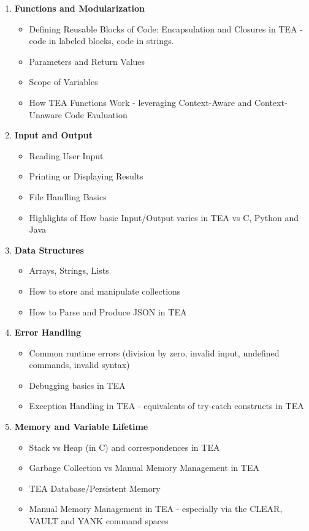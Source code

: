 \documentclass[a4paper, 18pt]{book} %
\begin{document}
{{{\begin{appendices}
\begin{enumerate}
\item{\textbf{Functions and Modularization}
\begin{itemize}
\item Defining Reusable Blocks of Code: Encapsulation and Closures in TEA - code in labeled blocks, code in strings.
\item Parameters and Return Values
\item Scope of Variables
\item How TEA Functions Work - leveraging Context-Aware and Context-Unaware Code Evaluation
\end{itemize}
}


\item{\textbf{Input and Output}
\begin{itemize}
\item Reading User Input
\item Printing or Displaying Results
\item File Handling Basics
\item Highlights of How basic Input/Output varies in TEA vs C, Python and Java
\end{itemize}
}


\item{\textbf{Data Structures}
\begin{itemize}
\item Arrays, Strings, Lists
\item How to store and manipulate collections
\item How to Parse and Produce JSON in TEA
\end{itemize}
}


\item{\textbf{Error Handling}
\begin{itemize}
\item Common runtime errors (division by zero, invalid input, undefined commands, invalid syntax)
\item Debugging basics in TEA
\item Exception Handling in TEA - equivalents of try-catch constructs in TEA
\end{itemize}
}


\item{\textbf{Memory and Variable Lifetime}
\begin{itemize}
\item Stack vs Heap (in C) and correspondences in TEA
\item Garbage Collection vs Manual Memory Management in TEA
\item TEA Database/Persistent Memory
\item Manual Memory Management in TEA - especially via the CLEAR, VAULT and YANK command spaces
\end{itemize}
}


\end{enumerate}
\end{appendices}}}}
\end{document}
